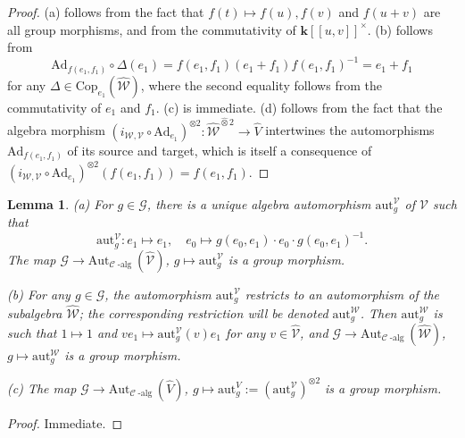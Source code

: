 \documentclass[10pt]{amsart}
\newtheorem{lem}[thm]{Lemma}
\numberwithin{equation}{subsection}
\begin{document}
\begin{proof}
(a) follows from the fact that $f(t)\mapsto f(u),f(v)$ and $f(u+v)$ are all group morphisms, and from the commutativity of 
$\mathbf k[[u,v]]^\times$. (b) follows from 
$$
\mathrm{Ad}_{f(e_1,f_1)}\circ\Delta(e_1)=f(e_1,f_1)(e_1+f_1)f(e_1,f_1)^{-1}=e_1+f_1
$$
for any $\Delta\in\mathrm{Cop}_{e_1}(\hat{\mathcal W})$, where the second equality follows
from the commutativity of $e_1$ and $f_1$. (c) is immediate. 
(d) follows from the fact that the algebra morphism
$(i_{\mathcal W,\mathcal V} \circ \mathrm{Ad}_{e_1})^{\otimes2} : \hat{\mathcal W}^{\hat\otimes2}\to\hat V$
intertwines the automorphisms $\mathrm{Ad}_{f(e_1,f_1)}$ of its source and target, which is itself a consequence of 
$(i_{\mathcal W,\mathcal V} \circ \mathrm{Ad}_{e_1})^{\otimes2}(f(e_1,f_1))=f(e_1,f_1)$.   
\end{proof}

\begin{lem}\label{lem:2:8:jan25}
(a) For $g\in\mathcal G$, there is a unique algebra automorphism $\mathrm{aut}_{g}^{\mathcal V}$ of $\hat{\mathcal V}$
such that 
\begin{equation}\label{def:aut:g:V:(1)}
\mathrm{aut}_g^{\mathcal V} : e_1 \mapsto e_1,\quad e_0 \mapsto g(e_0,e_1)\cdot e_0\cdot g(e_0,e_1)^{-1}. 
\end{equation}
The map 
$\mathcal G\to\mathrm{Aut}_{\mathcal C\operatorname{-alg}}(\hat{\mathcal V})$, $g\mapsto \mathrm{aut}_{g}^{\mathcal V}$
is a group morphism. 

(b) For any $g\in\mathcal G$, the automorphism $\mathrm{aut}_{g}^{\mathcal V}$ restricts to an automorphism of the 
subalgebra $\hat{\mathcal W}$; the corresponding restriction will be denoted $\mathrm{aut}_{g}^{\mathcal W}$. 
Then $\mathrm{aut}_{g}^{\mathcal W}$ is such that 
$1\mapsto 1$ and $ve_1\mapsto \mathrm{aut}_{g}^{\mathcal V}(v)e_1$ for any $v\in\hat{\mathcal V}$, and 
$\mathcal G\to\mathrm{Aut}_{\mathcal C\operatorname{-alg}}(\hat{\mathcal W})$, $g\mapsto \mathrm{aut}_{g}^{\mathcal W}$
is a group morphism. 

(c) The map $\mathcal G\to\mathrm{Aut}_{\mathcal C\operatorname{-alg}}(\hat V)$, $g\mapsto 
\mathrm{aut}_g^V:=(\mathrm{aut}_{g}^{\mathcal V})^{\otimes2}$
is a group morphism. 
\end{lem}

\begin{proof}
Immediate.  
\end{proof}
\end{document}
